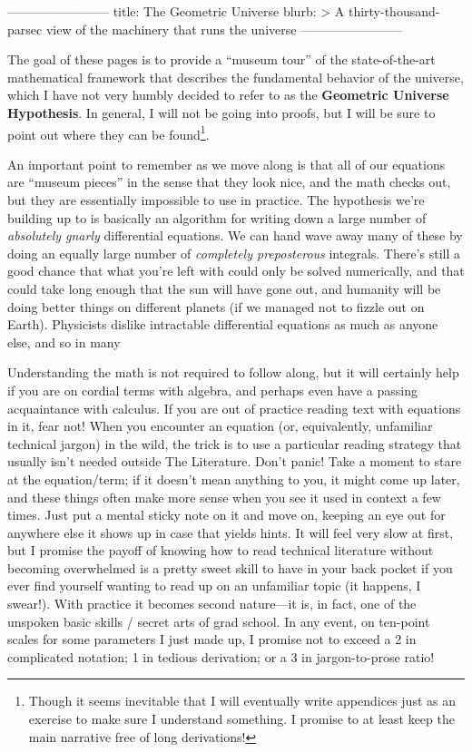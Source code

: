 ------------------------
title: The Geometric Universe
blurb: >
  A thirty-thousand-parsec view of the machinery that runs the universe
------------------------

The goal of these pages is to provide a ``museum tour'' of the state-of-the-art mathematical framework that describes the fundamental behavior of the universe, which I have not very humbly decided to refer to as the \textbf{Geometric Universe Hypothesis}. In general, I will not be going into proofs, but I will be sure to point out where they can be found\footnote{Though it seems inevitable that I will eventually write appendices just as an exercise to make sure I understand something. I promise to at least keep the main narrative free of long derivations!}.

An important point to remember as we move along is that all of our equations are ``museum pieces'' in the sense that they look nice, and the math checks out, but they are essentially impossible to use in practice. The hypothesis we're building up to is basically an algorithm for writing down a large number of \emph{absolutely gnarly} differential equations. We can hand wave away many of these by doing an equally large number of \emph{completely preposterous} integrals. There's still a good chance that what you're left with could only be solved numerically, and that could take long enough that the sun will have gone out, and humanity will be doing better things on different planets (if we managed not to fizzle out on Earth). Physicists dislike intractable differential equations as much as anyone else, and so in many 

Understanding the math is not required to follow along, but it will certainly help if you are on cordial terms with algebra, and perhaps even have a passing acquaintance with calculus. If you are out of practice reading text with equations in it, fear not! When you encounter an equation (or, equivalently, unfamiliar technical jargon) in the wild, the trick is to use a particular reading strategy that usually isn't needed outside The Literature. Don't panic! Take a moment to stare at the equation/term; if it doesn't mean anything to you, it might come up later, and these things often make more sense when you see it used in context a few times. Just put a mental sticky note on it and move on, keeping an eye out for anywhere else it shows up in case that yields hints. It will feel very slow at first, but I promise the payoff of knowing how to read technical literature without becoming overwhelmed is a pretty sweet skill to have in your back pocket if you ever find yourself wanting to read up on an unfamiliar topic (it happens, I swear!). With practice it becomes second nature---it is, in fact, one of the unspoken basic skills / secret arts of grad school. In any event, on ten-point scales for some parameters I just made up, I promise not to exceed a 2 in complicated notation; 1 in tedious derivation; or a 3 in jargon-to-prose ratio!

